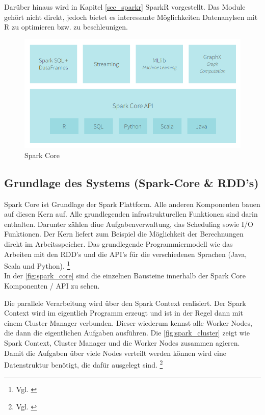 \noindent
Dar\"uber hinaus wird in Kapitel \ref{sec_sparkr} SparkR vorgestellt. Das Module gehört nicht direkt, jedoch bietet es interessante Möglichkeiten Datenanylsen mit R zu optimieren bzw. zu beschleunigen.


\begin{figure}[h]
  \centering
  \includegraphics[width=\textwidth]{./bilder/spark_core.png}
  \caption{Spark Core}\label{fig:spark_core}
\end{figure}









\newpage
\subsection{Grundlage des Systems (Spark-Core \& RDD’s)}\label{sec_sparkcore}
Spark Core ist Grundlage der Spark Plattform. Alle anderen Komponenten bauen auf diesen Kern auf. Alle grundlegenden infrastrukturellen Funktionen sind darin enthalten. Darunter zählen diue Aufgabenverwaltung, das Scheduling sowie I/O Funktionen.
Der Kern liefert zum Beispiel die Möglichkeit der Berechnungen direkt im Arbeitsspeicher. 
Das grundlegende Programmiermodell wie das Arbeiten mit den RDD's und die API's für die verschiedenen Sprachen (Java, Scala und Python).  \footnote{Vgl. \cite{DATABRICK_ABOUT}} \\
In der \autoref{fig:spark_core} sind die einzelnen Bausteine innerhalb der Spark Core Komponenten / API zu sehen. 
 


\noindent
Die parallele Verarbeitung wird über den Spark Context realisiert. Der Spark Context wird im eigentlich Programm erzeugt und ist in der Regel dann mit einem Cluster Manager verbunden. Dieser wiederum kennst alle Worker Nodes, die dann die eigentlichen Aufgaben ausführen. Die \autoref{fig:spark_cluster} zeigt wie Spark Context, Cluster Manager und die Worker Nodes zusammen agieren. Damit die Aufgaben über viele Nodes verteilt werden können wird eine Datenstruktur benötigt, die dafür ausgelegt sind. \footnote{Vgl. \cite[101]{BDS16}}

